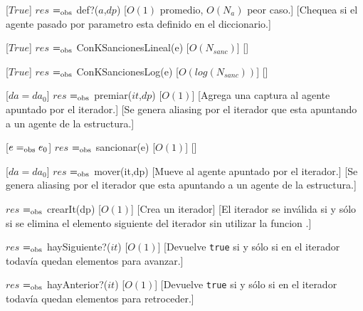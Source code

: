 \begin{Interfaz}
      [$True$]
      {$res$ $=_{\mathrm{obs}}$ def?($a$,$dp$)}
      [$O(1)$ promedio, $O(N_{a})$ peor caso.]
      [Chequea si el agente pasado por parametro esta definido en el diccionario.]
	
      [$True$]
      {$res$ $=_{\mathrm{obs}}$ ConKSancionesLineal(e)}
      [$O(N_{sanc})$]
      []

      [$True$]
      {$res$ $=_{\mathrm{obs}}$ ConKSancionesLog(e)}
      [$O(log(N_{sanc}))$]
      []

      [$da = da_{0}$]
      {$res$ $=_{\mathrm{obs}}$ premiar($it$,$dp$)}
      [$O(1)$]
      [Agrega una captura al agente apuntado por el iterador.]
      [Se genera aliasing por el iterador que esta apuntando a un agente de la estructura.]

      [$ e =_{\mathrm{obs}} e_{0}$]
      {$res$ $=_{\mathrm{obs}}$ sancionar(e)}
      [$O(1)$]
      []

      [$da = da_{0}$]
      {$res$ $=_{\mathrm{obs}}$ mover(it,dp)}
      [Mueve al agente apuntado por el iterador.]
      [Se genera aliasing por el iterador que esta apuntando a un agente de la estructura.] 

      {$res$ $=_{\mathrm{obs}}$ crearIt(dp)}
      [$O(1)$]
      [Crea un iterador]
      [El iterador se inv\'alida si y s\'olo si se elimina el elemento siguiente del iterador sin utilizar la funcion .]

      {$res$ $=_{\mathrm{obs}}$ haySiguiente?($it$)}
      [$O(1)$]
      [Devuelve \texttt{true} si y s\'olo si en el iterador todavía quedan elementos para avanzar.]

      {$res$ $=_{\mathrm{obs}}$ hayAnterior?($it$)}
      [$O(1)$]
      [Devuelve \texttt{true} si y s\'olo si en el iterador todavía quedan elementos para retroceder.]


\end{Interfaz}
